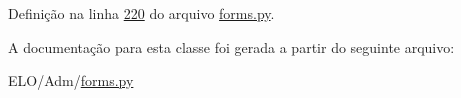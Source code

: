 Definição na linha \hyperlink{Adm_2forms_8py_source_l00220}{220} do arquivo \hyperlink{Adm_2forms_8py_source}{forms.\-py}.



A documentação para esta classe foi gerada a partir do seguinte arquivo\-:\begin{DoxyCompactItemize}
\item 
E\-L\-O/\-Adm/\hyperlink{Adm_2forms_8py}{forms.\-py}\end{DoxyCompactItemize}
